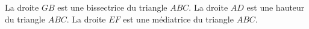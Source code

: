 %
%
    \begin{tasks}
        \task La droite $GB$ est une bissectrice du triangle $ABC$.
        \task La droite $AD$ est une hauteur du triangle $ABC$.
        \task La droite $EF$ est une médiatrice du triangle $ABC$.
    \end{tasks}
